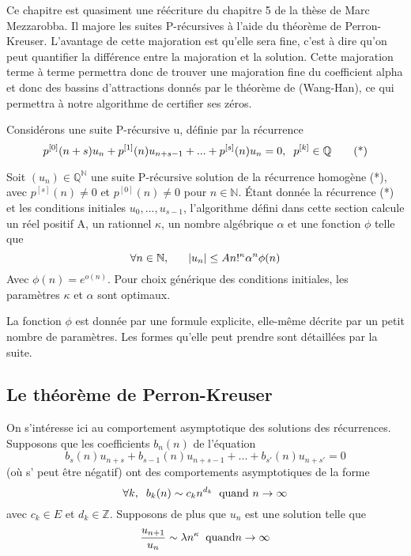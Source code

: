 \documentclass[a4paper,10.5pt]{article}
\begin{document}
	Ce chapitre est quasiment une réécriture du chapitre 5 de la thèse de Marc Mezzarobba. Il majore les suites P-récursives à l'aide du théorème de Perron-Kreuser.
	L'avantage de cette majoration est qu'elle sera fine, c'est à dire qu'on peut quantifier la différence entre la majoration et la solution.
	Cette majoration terme à terme permettra donc de trouver une majoration fine du coefficient alpha et donc des bassins d'attractions donnés par le théorème de (Wang-Han), ce qui permettra à notre algorithme de certifier ses zéros.
	
	Considérons une suite P-récursive u, définie par la récurrence
	\[p^{[0]}(n+s)u_{n}+p^{[1]}(n)u_{n+s-1}+...+p^{[s]}(n)u_{n}=0,\hspace{2mm} p^{[k]}\in \mathbb{Q} \tag{*}\] 
	\begin{theorem}Soit $(u_{n})\in \mathbb{Q}^{\mathbb{N}}$ une suite P-récursive solution de la récurrence homogène (*), avec $p^{[s]}(n) \neq 0$ et $p^{[0]}(n) \neq 0$ pour $n \in \mathbb{N}$. Étant donnée la récurrence (*) et les conditions initiales $u_{0},...,u_{s-1}$, l'algorithme défini dans cette section calcule un réel positif A, un rationnel $\kappa$, un nombre algébrique $\alpha$  et une fonction $\phi$ telle que
		\[\forall n\in \mathbb{N}, \hspace{6mm}|u_{n}| \leq A n!^{\kappa}\alpha^{n}\phi(n)\]
		Avec $\phi(n)=e^{o(n)}$. Pour choix générique des conditions initiales, les paramètres $\kappa$ et $\alpha$ sont optimaux.
	\end{theorem}
	
	La fonction $\phi$ est donnée par une formule explicite, elle-même décrite par un petit nombre de paramètres. Les formes qu'elle peut prendre sont détaillées par la suite.
	
	\subsection{Le théorème de Perron-Kreuser}
	
	On s'intéresse ici au comportement asymptotique des solutions des récurrences. Supposons que les coefficients $b_{n}(n)$ de l'équation
	\[b_{s}(n)u_{n+s}+b_{s-1}(n)u_{n+s-1}+...+b_{s'}(n)u_{n+s'}=0  \tag{*}\]
	(où s' peut être négatif) ont des comportements asymptotiques de la forme
	\[\forall k, \hspace{2mm} b_{k}(n) \sim c_{k}n^{d_{k}} \hspace{2mm} \text{quand } n \rightarrow \infty\]
	avec $c_{k} \in E$ et $d_{k} \in \mathbb{Z}$. Supposons de plus que $u_{n}$ est une solution telle que  
	\[\frac{u_{n+1}}{u_{n}}\sim \lambda n^{\kappa} \hspace{2mm} \text{quand}n \rightarrow \infty\]
	
\end{document}
